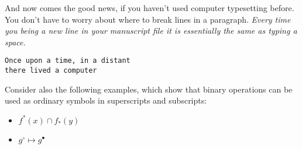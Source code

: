 \documentclass{article}
\begin{document}
And now comes the good news, if you haven't used
computer typesetting before. You don't have to worry about where to
break lines in a paragraph.
\textit{Every time you being a new line in your manuscript file 
it is essentially the same as typing a space.}

\begin{verbatim}
Once upon a time, in a distant
there lived a computer
\end{verbatim}

Consider also the following examples, which show that binary operations
can be used as ordinary symbols in superscripts and subscripts:

\begin{itemize}
\item $f^*(x) \cap f_*(y)$
\item $g^\circ \mapsto g^\bullet$
\end{itemize}
\end{document}
